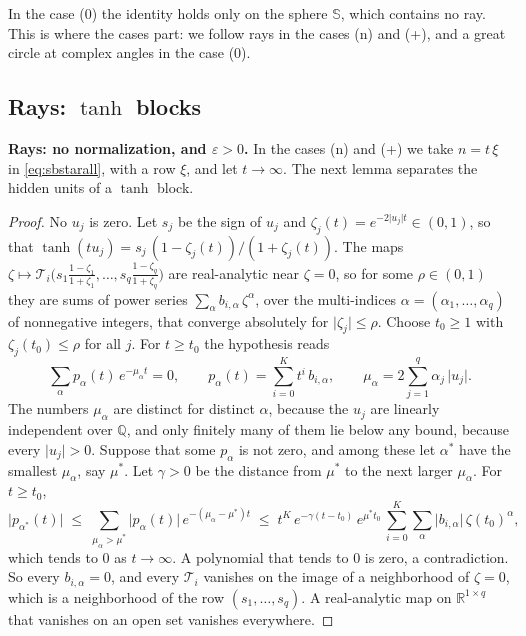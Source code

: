 \documentclass[10pt]{article}
\theoremstyle{definition}
\theoremstyle{remark}
\newcommand{\R}{\mathbb{R}}
\newcommand{\para}[1]{\smallskip\noindent\textbf{#1}\hspace{0.5em}}
\begin{document}
In the case (0) the identity holds only on the sphere $\mathbb S$, which contains no ray. This is where the cases part: we follow rays in the cases (n) and (+), and a great circle at complex angles in the case (0).

\subsection{Rays: \texorpdfstring{$\tanh$}{tanh} blocks}\label{app:raystanh}

\para{Rays: no normalization, and $\varepsilon > 0$.} In the cases (n) and (+) we take $n = t\,\xi$ in \eqref{eq:sbstarall}, with a row $\xi$, and let $t \to \infty$. The next lemma separates the hidden units of a $\tanh$ block.

\lemRaySep*

\begin{proof}
No $u_j$ is zero. Let $s_j$ be the sign of $u_j$ and $\zeta_j(t) = e^{-2\lvert u_j\rvert t} \in (0, 1)$, so that $\tanh(tu_j) = s_j\,(1 - \zeta_j(t))/(1 + \zeta_j(t))$. The maps $\zeta \mapsto \mathcal T_i\big(s_1\frac{1 - \zeta_1}{1 + \zeta_1}, \dots, s_q\frac{1 - \zeta_q}{1 + \zeta_q}\big)$ are real-analytic near $\zeta = 0$, so for some $\rho \in (0, 1)$ they are sums of power series $\sum_\alpha b_{i,\alpha}\,\zeta^\alpha$, over the multi-indices $\alpha = (\alpha_1, \dots, \alpha_q)$ of nonnegative integers, that converge absolutely for $\lvert\zeta_j\rvert \le \rho$. Choose $t_0 \ge 1$ with $\zeta_j(t_0) \le \rho$ for all $j$. For $t \ge t_0$ the hypothesis reads
\[
\sum_\alpha p_\alpha(t)\,e^{-\mu_\alpha t} = 0, \qquad p_\alpha(t) = \sum_{i=0}^{K} t^i\,b_{i,\alpha}, \qquad \mu_\alpha = 2\sum_{j=1}^{q}\alpha_j\,\lvert u_j\rvert .
\]
The numbers $\mu_\alpha$ are distinct for distinct $\alpha$, because the $u_j$ are linearly independent over $\mathbb Q$, and only finitely many of them lie below any bound, because every $\lvert u_j\rvert > 0$. Suppose that some $p_\alpha$ is not zero, and among these let $\alpha^*$ have the smallest $\mu_\alpha$, say $\mu^*$. Let $\gamma > 0$ be the distance from $\mu^*$ to the next larger $\mu_\alpha$. For $t \ge t_0$,
\[
\lvert p_{\alpha^*}(t)\rvert \;\le\; \sum_{\mu_\alpha > \mu^*}\lvert p_\alpha(t)\rvert\,e^{-(\mu_\alpha - \mu^*)t}
\;\le\; t^K\,e^{-\gamma(t - t_0)}\,e^{\mu^*t_0}\,\sum_{i=0}^{K}\sum_\alpha\lvert b_{i,\alpha}\rvert\,\zeta(t_0)^\alpha ,
\]
which tends to $0$ as $t \to \infty$. A polynomial that tends to $0$ is zero, a contradiction. So every $b_{i,\alpha} = 0$, and every $\mathcal T_i$ vanishes on the image of a neighborhood of $\zeta = 0$, which is a neighborhood of the row $(s_1, \dots, s_q)$. A real-analytic map on $\R^{1\times q}$ that vanishes on an open set vanishes everywhere.
\end{proof}
\end{document}
